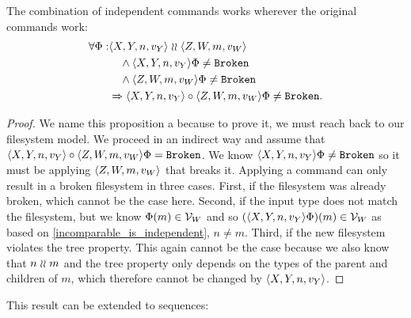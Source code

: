 \begin{myax}\label{combine_independent_commands}
The combination of independent commands works wherever the original commands work:
\begin{align*}
\forall\Phi: &\langle{X,Y,n,v_Y}\rangle\mathrel{\wr\wr} \langle{Z,W,m,v_W}\rangle \\
&\quad\wedge \langle{X,Y,n,v_Y}\rangle\Phi\neq\mathtt{Broken} \\
&\quad\wedge \langle{Z,W,m,v_W}\rangle\Phi\neq\mathtt{Broken} \\
&\Rightarrow \langle{X,Y,n,v_Y}\rangle\circ \langle{Z,W,m,v_W}\rangle\Phi\neq\mathtt{Broken}.
\end{align*}
\end{myax}
\begin{proof}
We name this proposition a  
because to prove it, we must reach back to our filesystem model.
We proceed in an indirect way and
assume that $\langle{X,Y,n,v_Y}\rangle\circ \langle{Z,W,m,v_W}\rangle\Phi=\mathtt{Broken}$.
We know $\langle{X,Y,n,v_Y}\rangle\Phi\neq\mathtt{Broken}$ so it must be applying 
$\langle{Z,W,m,v_W}\rangle$ that breaks it.
Applying a command can only result in a broken filesystem in three cases.
First, if the filesystem was already broken, which cannot be the case here.
Second, if the input type does not match the filesystem,
but we know $\Phi(m)\in\mathcal{V}_{W}$ and so
$(\langle{X,Y,n,v_Y}\rangle\Phi)(m)\in\mathcal{V}_{W}$ as based on \cref{incomparable_is_independent}, $n\neq m$.
Third, if the new filesystem violates the tree property.
This again cannot be the case because we also know that $n\mathrel{\wr\wr} m$
and the tree property only depends on the types of the parent and children of $m$,
which therefore cannot be changed by $\langle{X,Y,n,v_Y}\rangle$.
\end{proof}

This result can be extended to sequences:

